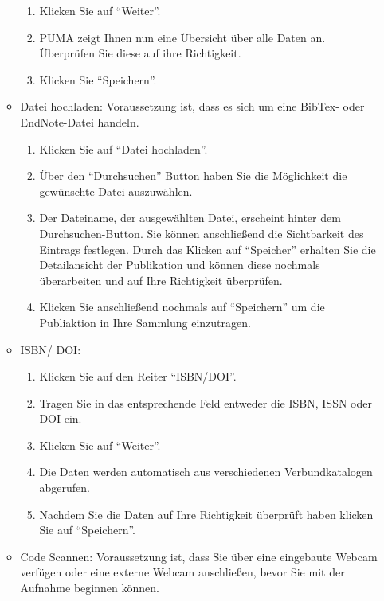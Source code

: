 \documentclass[a4paper,11pt,twoside]{scrbook}
\begin{document}
\begin{enumerate}
\begin{itemize}
\begin{enumerate}
            \item Klicken Sie auf \enquote{Weiter}.
            \item PUMA zeigt Ihnen nun eine Übersicht über alle Daten an. Überprüfen Sie diese auf ihre Richtigkeit.
            \item Klicken Sie \enquote{Speichern}.
        \end{enumerate}
        \item Datei hochladen:\newline
        Voraussetzung ist, dass es sich um eine BibTex- oder EndNote-Datei handeln.
        \begin{enumerate}
            \item Klicken Sie auf \enquote{Datei hochladen}.
            \item Über den \enquote{Durchsuchen} Button haben Sie die Möglichkeit die gewünschte Datei auszuwählen.
            \item Der Dateiname, der ausgewählten Datei, erscheint hinter dem Durchsuchen-Button. Sie können anschließend die Sichtbarkeit des Eintrags festlegen. Durch das Klicken auf \enquote{Speicher} erhalten Sie die Detailansicht der Publikation und können diese nochmals überarbeiten und auf Ihre Richtigkeit überprüfen.
            \item Klicken Sie anschließend nochmals auf \enquote{Speichern} um die Publiaktion in Ihre Sammlung einzutragen.
        \end{enumerate}
        \item ISBN/ DOI:
        \begin{enumerate}
            \item Klicken Sie auf den Reiter \enquote{ISBN/DOI}.
            \item Tragen Sie in das entsprechende Feld entweder die ISBN, ISSN oder DOI ein.
            \item Klicken Sie auf \enquote{Weiter}.
            \item Die Daten werden automatisch aus verschiedenen Verbundkatalogen abgerufen.
            \item Nachdem Sie die Daten auf Ihre Richtigkeit überprüft haben klicken Sie auf \enquote{Speichern}.
        \end{enumerate}
        \item Code Scannen: %
        \newline
        Voraussetzung ist, dass Sie über eine eingebaute Webcam verfügen oder eine externe Webcam anschließen, bevor Sie mit der Aufnahme beginnen können.

\end{itemize}
\end{enumerate}
\end{document}
